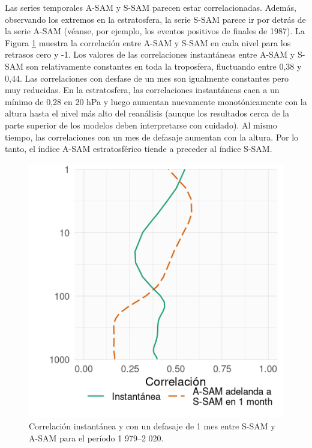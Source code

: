 \documentclass[12pt,oneside,a4paper]{reedthesis}
\begin{document}
Las series temporales A-SAM y S-SAM parecen estar correlacionadas.
Además, observando los extremos en la estratosfera, la serie S-SAM parece ir por detrás de la serie A-SAM (véanse, por ejemplo, los eventos positivos de finales de 1987).
La Figura \ref{fig:cor-lev} muestra la correlación entre A-SAM y S-SAM en cada nivel para los retrasos cero y -1.
Los valores de las correlaciones instantáneas entre A-SAM y S-SAM son relativamente constantes en toda la troposfera, fluctuando entre 0,38 y 0,44.
Las correlaciones con desfase de un mes son igualmente constantes pero muy reducidas.
En la estratosfera, las correlaciones instantáneas caen a un mínimo de 0,28 en 20 hPa y luego aumentan nuevamente monotónicamente con la altura hasta el nivel más alto del reanálisis (aunque los resultados cerca de la parte superior de los modelos deben interpretarse con cuidado).
Al mismo tiempo, las correlaciones con un mes de defasaje aumentan con la altura.
Por lo tanto, el índice A-SAM estratosférico tiende a preceder al índice S-SAM.



\begin{figure}

{\centering \includegraphics{figures/30-sam/cor-lev-1} 

}

\caption{Correlación instantánea y con un defasaje de 1 mes entre S-SAM y A-SAM para el período 1 979--2 020.}\label{fig:cor-lev}
\end{figure}
\end{document}
